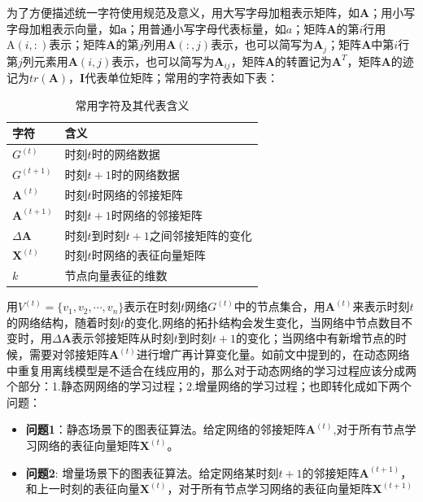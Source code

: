 为了方便描述统一字符使用规范及意义，用大写字母加粗表示矩阵，如$\textbf{A}$；用小写字母加粗表示向量，如$\textbf{a}$；用普通小写字母代表标量，如$a$；矩阵$\textbf{A}$的第$i$行用$\text{A}(i,:)$表示；矩阵$\textbf{A}$的第$j$列用$\textbf{A}(:,j)$表示，也可以简写为$\textbf{A}_j$；矩阵$\textbf{A}$中第$i$行第$j$列元素用$\textbf{A}(i,j)$表示，也可以简写为$\textbf{A}_{ij}$，矩阵$\textbf{A}$的转置记为$\textbf{A}^T$，矩阵$\textbf{A}$的迹记为$tr(\textbf{A})$，$\textbf{I}$代表单位矩阵；常用的字符表如下表：
\begin{table}
	\centering
	\caption{常用字符及其代表含义}
	\begin{tabular}{|C{1.8in}|C{3.3in}|}
		\hline
		\textbf{字符} & \textbf{含义} \\ \hline\hline
		$G^{(t)}$ & 时刻$t$时的网络数据 \\ \hline
		$G^{(t+1)}$& 时刻$t+1$时的网络数据  \\ \hline
		$\textbf{A}^{(t)}$ & 时刻$t$时网络的邻接矩阵 \\ \hline
		$\textbf{A}^{(t+1)}$ & 时刻$t+1$时网络的邻接矩阵 \\ \hline
		$\Delta\textbf{A}$ & 时刻$t$到时刻$t+1$之间邻接矩阵的变化 \\ \hline
		$\textbf{X}^{(t)}$ & 时刻$t$时网络的表征向量矩阵 \\ \hline
		$k$ & 节点向量表征的维数  \\ \hline
	\end{tabular}
\end{table}

用$V^{(t)} = \{v_1, v_2,\cdots,v_n\}$表示在时刻$t$网络$G^{(t)}$中的节点集合，用$\textbf{A}^{(t)}$来表示时刻$t$的网络结构，随着时刻$t$的变化,网络的拓扑结构会发生变化，当网络中节点数目不变时，用$\Delta\textbf{A}$表示邻接矩阵从时刻$t$到时刻$t+1$的变化；当网络中有新增节点的时候，需要对邻接矩阵$\textbf{A}^{(t)}$进行增广再计算变化量。如前文中提到的，在动态网络中重复用离线模型是不适合在线应用的，那么对于动态网络的学习过程应该分成两个部分：1.静态网网络的学习过程；2.增量网络的学习过程；也即转化成如下两个问题：
\begin{itemize}
	\item \textbf{问题1}：静态场景下的图表征算法。给定网络的邻接矩阵$\textbf{A}^{(t)}$,对于所有节点学习网络的表征向量矩阵$\textbf{X}^{(t)}$。
	\item \textbf{问题2}: 增量场景下的图表征算法。给定网络某时刻$t+1$的邻接矩阵$\textbf{A}^{(t+1)}$，
		和上一时刻的表征向量$\textbf{X}^{(t)}$，对于所有节点学习网络的表征向量矩阵$\textbf{X}^{(t+1)}$
\end{itemize}

